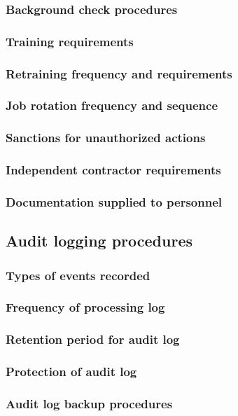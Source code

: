 \documentclass[10pt]{article}
\begin{document}
\subsubsection{Background check procedures}
\subsubsection{Training requirements}
\subsubsection{Retraining frequency and requirements}
\subsubsection{Job rotation frequency and sequence}
\subsubsection{Sanctions for unauthorized actions}
\subsubsection{Independent contractor requirements}
\subsubsection{Documentation supplied to personnel}
\subsection{Audit logging procedures}
\subsubsection{Types of events recorded}
\subsubsection{Frequency of processing log}
\subsubsection{Retention period for audit log}
\subsubsection{Protection of audit log}
\subsubsection{Audit log backup procedures}
\end{document}
